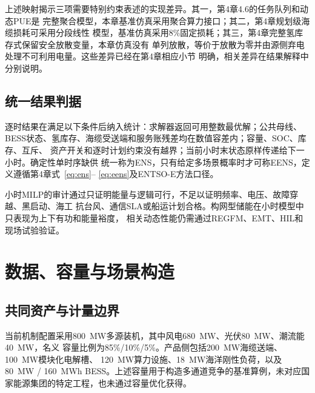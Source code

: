 上述映射揭示三项需要特别约束表述的实现差异。其一，第4章4.6的任务队列和动态PUE是
完整聚合模型，本章基准仿真采用聚合算力接口；其二，第4章规划级海缆损耗可采用分段线性
模型，基准仿真采用8\%固定损耗；其三，第4章完整氢库存式保留安全放散变量，本章仿真没有
单列放散，等价于放散为零并由源侧弃电处理不可利用电量。这些差异已经在第4章相应小节
明确，相关差异在结果解释中分别说明。

\subsection{统一结果判据}

逐时结果在满足以下条件后纳入统计：求解器返回可用整数最优解；公共母线、
BESS状态、氢库存、海缆受送端和服务账残差均在数值容差内；容量、SOC、库存、互斥、
资产开关和逐时计划约束没有越界；当前小时末状态原样传递给下一小时。确定性单时序缺供
统一称为ENS，只有给定多场景概率时才可称EENS，定义遵循第4章式~\eqref{eq:ens}--
\eqref{eq:eens}及ENTSO-E方法口径\cite{entsoe-maf}。

小时MILP的审计通过只证明能量与逻辑可行，不足以证明频率、电压、故障穿越、黑启动、海工
抗台风、通信SLA或船运计划合格。构网型储能在小时模型中只表现为上下有功和能量裕度，
相关动态性能仍需通过REGFM、EMT、HIL和现场试验验证。

\section{数据、容量与场景构造}

\subsection{共同资产与计量边界}

当前机制配置采用800~MW多源装机，其中风电680~MW、光伏80~MW、潮流能40~MW，名义
容量比例为85\%/10\%/5\%。产品侧包括200~MW海缆送端、100~MW模块化电解槽、
120~MW算力设施、18~MW海洋刚性负荷，以及80~MW / 160~MWh BESS。上述容量用于构造多通道竞争的基准算例，未对应国家能源集团的特定工程，也未通过容量优化获得。

